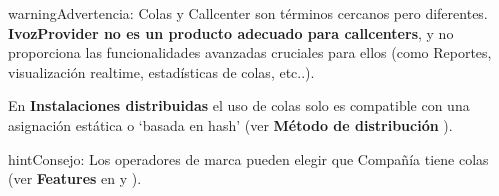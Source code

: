 \documentclass[letterpaper,10pt,spanish]{sphinxmanual}
\begin{document}
\begin{notice}{warning}{Advertencia:}
Colas y Callcenter son términos cercanos pero diferentes. \textbf{IvozProvider no es un producto adecuado para callcenters}, y no proporciona las funcionalidades avanzadas cruciales para ellos (como Reportes, visualización realtime, estadísticas de colas, etc..).
\end{notice}

En \textbf{Instalaciones distribuidas} el uso de colas solo es compatible con una asignación estática o `basada en hash' (ver \textbf{Método de distribución} {\hyperref[internal_calls/brand_portal:remaining\string-parameters]{}}).

\begin{notice}{hint}{Consejo:}
Los operadores de marca pueden elegir que Compañía tiene colas (ver \textbf{Features} en {\hyperref[internal_calls/brand_portal:brand\string-configuration]{}} y {\hyperref[internal_calls/company_portal:company\string-configuration]{}}).
\end{notice}
\end{document}
